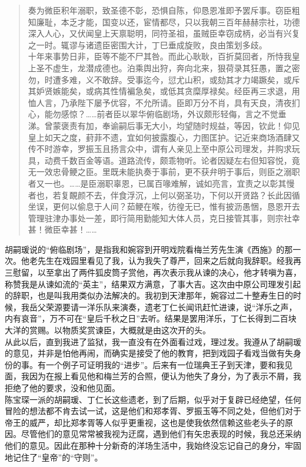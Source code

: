 \begin{quote}
	奏为微臣积年溺职，致圣德不彰，恐惧自陈，仰恳恩准即予罢斥事。窃臣粗知廉耻，本乏才能，国变以还，宦情都尽，只以我朝三百年赫赫宗社，功德深入人心，又伏闻皇上天禀聪明，同符圣祖，虽贼臣幸窃成柄，必当有兴复之一时。辄谬与诸遗臣密围大计，丁巳垂成旋败，良由策划多歧。\\

十年来事势日非，臣等不能不尸其咎。而此心耿耿，百折莫回者，所恃我皇上圣不虚生，龙潜成德也。泊乘舆出狩，奔向北来，狠荷录其狂愚，置之密勿，时遭多难，义不敢辞。受事迄今，愆尤山积，或劾其才力竭蹶矣，或斥其妒贤嫉能矣，或病其性情褊急矣，或低其贪糜厚禄矣。经臣再三求退，用恤人言，乃承陛下屡予优容，不允所请。臣即万分不肖，具有天良，清夜扪心，能勿感惊？……前者臣以翠华俯临剧场，外议颇形轻侮，言之不觉垂涕。曾蒙褒责有加，奉谕嗣后事无大小，均望随时规益，等因，钦此！仰见皇上如天之度，葑菲不遗，宜如何披露腹心，力图匡护。记近来商场酒肆又传不时游幸，罗振玉且扬言众中，谓有人亲见上至中原公司理发，并购求玩具，动费千数百金等语。道路流传，颇乖物听。论者因疑左右但知容悦，竟无一效忠骨鲠之臣。里既未能执奏于事前，更不获弁明于事后，则臣之溺职者又一也。……是臣溺职辜恩，已属百喙难解，诚如亮言，宜责之以彰其慢者也，若复靦颜不去，伴食浮沉，上何以弼圣功，下何以开贤路？长此因循坐误，更何以偷息于人间？茹鲠在喉，彷徨无已，惟有披沥愚悃，恳恩开去管理驻津办事处一差，即行简用勤能知大体人员，克日接管其事，则宗社幸甚！微臣幸甚！……\\
\end{quote}

胡嗣瑗说的“俯临剧场”，是指我和婉容到开明戏院看梅兰芳先生演《西施》的那一次。他老先生在戏园里看见了我，认为我失了尊严，回来之后就向我辞职。经我再三慰留，以至拿出了两件狐皮筒子赏他，再次表示我从谏的决心，他才转嗔为喜，称赞我是从谏如流的“英主”，结果双方满意，了事大吉。这次由中原公司理发引起的辞职，也是叫我用类似办法解决的。我初到天津那年，婉容过二十整寿生日的时候，我岳父荣源要请一洋乐队来演奏，遗老丁仁长闻讯赶忙进谏，说“洋乐之声，内有哀音”，万不可在“皇后千秋之日”去听。结果是罢用洋乐，丁仁长得到二百块大洋的赏赐。以物质奖赏谏臣，大概就是由这次开的头。\\

从此以后，直到我进了监狱，我一直没有在外面看过戏，理过发。我遵从了胡嗣瑗的意见，并非是怕他再闹，而确实是接受了他的教育，把到戏园子看戏当做有失身份的事。有一个例子可证明我的“进步”。后来有一位瑞典王子到天津，要和我见面，我因为在报上看见他和梅兰芳的合照，便认为他失了身分，为了表示不屑，我拒绝了他的要求，没和他见面。\\

陈宝琛一派的胡嗣瑗、丁仁长这些遗老，到了后期，似乎对于复辟已经绝望，任何冒险的想法都不肯去试一试，这是他们和郑孝胥、罗振玉等不同之处，但他们对于帝王的威严，却比郑孝胥等人似乎更重视，这也是使我依然信赖这些老头子的原因。尽管他们的意见常常被我视为迂腐，遇到他们有矢忠表现的时候，我总还采纳他们的意见。因此在那种十分新奇的洋场生活中，我始终没忘记自己的身分，牢固地记住了“皇帝”的“守则”。\\

